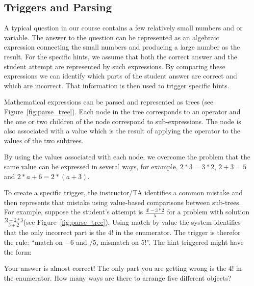 \documentclass{llncs2e/llncs}
\begin{document}
\subsection*{Triggers and Parsing}

A typical question in our course contains a few relatively small
numbers and or variable. The answer to the question can be represented
as an algebraic expression connecting the small numbers and producing
a large number as the result. For the specific hints, we assume that
both the correct answer and the student attempt are represented by
such expressions. By comparing these expressions we can identify which
parts of the student answer are correct and which are incorrect. That
information is then used to trigger specific hints.

Mathematical expressions can be parsed and represented as trees (see Figure~\ref{fig:parse_tree}). Each node in the tree corresponds to an operator and the one or two children of the node correspond to sub-expressions. The node is also associated with a value which is the result of applying the operator to the values of the two subtrees.

By using the values associated with each node, we overcome the problem
that the same value can be expressed in several ways, for example,
$2*3 = 3*2$, $2+3=5$ and $2*a+6 = 2*(a+3)$. 

To create a specific trigger, the instructor/TA identifies a common mistake and then represents that mistake using value-based comparisons between sub-trees. For example, suppose the student's attempt is $\frac{4!-3*2}{5}$ for a problem with solution $\frac{5!-2*3}{3+2}$(see Figure~\ref{fig:parse_tree}). Using match-by-value the system identifies that the only incorrect part is the $4!$ in the enumerator. The trigger is therefor the rule: ``match on $-6$ and $/5$, mismatch on $5!$''. The hint triggered might have the form:
\begin{displayquote}
Your answer is almost correct! The only part you are getting wrong is
the $4!$ in the enumerator. How many ways are there to arrange five different objects?
\end{displayquote}
\end{document}
